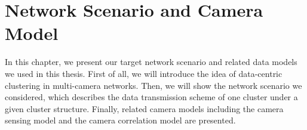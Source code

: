 \chapter{Network Scenario and Camera Model}
\label{sec::scenarioAndModel}
In this chapter, we present our target network scenario and related data models we used in this thesis.
First of all, we will introduce the idea of data-centric clustering in multi-camera networks.
Then, we will show the network scenario we considered, which describes the data transmission scheme of one cluster under a given cluster structure.
Finally, related camera models including the camera sensing model and the camera correlation model are presented.


